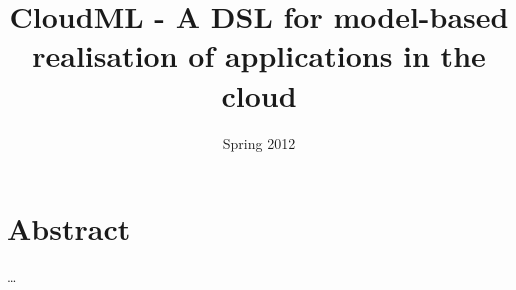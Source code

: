 \documentclass{article}
\begin{document}
\title{CloudML - A DSL for model-based realisation of applications in the cloud}
\date{Spring 2012}

\maketitle
\section*{Abstract}
\ldots

\tableofcontents{}







\end{document}
